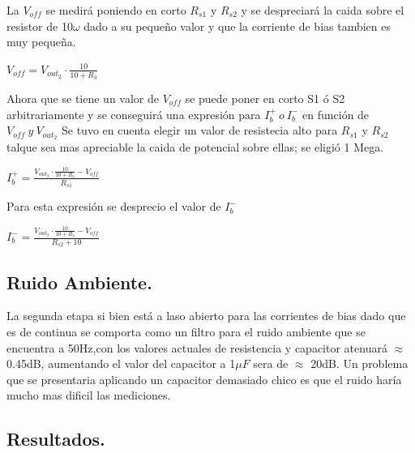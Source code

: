 La $V_{off}$ se medirá poniendo en corto $R_{s1}$ y $R_{s2}$ y se despreciará la caida sobre el resistor de 10$\omega$ dado a su pequeño valor y que la corriente de bias tambien es muy pequeña.\\
\begin{center}$V_{off}=V_{out_2} \cdot \frac{10}{10+R_3} $\end{center}
Ahora que se tiene un valor de $V_{off}$ se  puede poner en corto S1 ó S2 arbitrariamente y se conseguirá una expresión para $ I_b^+ \ o \  I_b^-$ en función de $V_{off} \ y \ V_{out_2}$
Se tuvo en cuenta elegir un valor de resistecia alto para $R_{s1}$ y $R_{s2}$ talque sea mas apreciable la caida de potencial sobre ellas; se eligió 1 Mega.\\
\begin{center}$I_b^+=\frac{V_{out_2} \cdot \frac{10}{10+R_3}-V_{off}}{R_{s1}}$\end{center}
Para esta expresión se desprecio el valor de $I_b^-$
\begin{center}$I_b^-=\frac{V_{out_2} \cdot \frac{10}{10+R_3}-V_{off}}{R_{s2}+10}$\end{center}

\subsection{Ruido Ambiente.}
La segunda etapa si bien está a laso abierto para las corrientes de bias dado que es de continua se comporta como un filtro para el ruido ambiente que se encuentra a 50Hz,con los valores actuales de resistencia y capacitor atenuará $\approx$ 0.45dB, aumentando el valor del capacitor a 1$\mu F$ sera de  $\approx$ 20dB.
Un problema que se presentaria aplicando un capacitor demasiado chico es que el ruido haría mucho mas dificil las mediciones.
\subsection{Resultados.}
